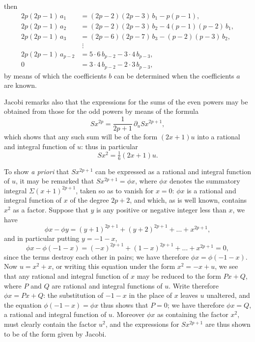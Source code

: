 \documentclass[11pt]{article}
\begin{document}
\noindent then
\[
\begin{aligned}
2p(2p-1)\,a_{1} &= (2p-2)(2p-3)\,b_{1} - p(p-1),\\
2p(2p-1)\,a_{2} &= (2p-2)(2p-3)\,b_{2} - 4(p-1)(p-2)\,b_{1},\\
2p(2p-1)\,a_{3} &= (2p-6)(2p-7)\,b_{3} - (p-2)(p-3)\,b_{2},\\
&\;\vdots\\
2p(2p-1)\,a_{p-2} &= 5\cdot 6\, b_{p-2} - 3\cdot 4\, b_{p-3},\\
0 &= 3\cdot 4\, b_{p-2} - 2\cdot 3\, b_{p-3},
\end{aligned}
\]
by means of which the coefficients $b$ can be determined when the coefficients $a$ are
known.

Jacobi remarks also that the expressions for the sums of the even powers may
be obtained from those for the odd powers by means of the formula
\[
S x^{2p} = \frac{1}{2p+1}\,\partial_{u} S x^{2p+1},
\]
which shows that any such sum will be of the form $(2x+1)u$ into a rational and
integral function of $u$: thus in particular
\[
S x^{2} = \tfrac{1}{6}(2x+1)u.
\]

To show \textit{a priori} that $S x^{2p+1}$ can be expressed as a rational and integral function
of $u$, it may be remarked that $S x^{2p+1} = \phi x$, where $\phi x$ denotes the summatory integral
$\Sigma(x+1)^{2p+1}$, taken so as to vanish for $x=0$: $\phi x$ is a rational and integral function
of $x$ of the degree $2p+2$, and which, as is well known, contains $x^{2}$ as a factor.
Suppose that $y$ is any positive or negative integer less than $x$, we have
\[
\phi x - \phi y = (y+1)^{2p+1} + (y+2)^{2p+1} + \ldots + x^{2p+1},
\]
and in particular putting $y = -1 - x$,
\[
\phi x - \phi(-1-x) = (-x)^{2p+1} + (1-x)^{2p+1} + \ldots + x^{2p+1} = 0,
\]
since the terms destroy each other in pairs; we have therefore $\phi x = \phi(-1-x)$.
Now $u = x^{2} + x$, or writing this equation under the form $x^{2} = -x + u$, we see that any
rational and integral function of $x$ may be reduced to the form $Px + Q$, where
$P$ and $Q$ are rational and integral functions of $u$. Write therefore $\phi x = Px + Q$: the
substitution of $-1-x$ in the place of $x$ leaves $u$ unaltered, and the equation
$\phi(-1-x) = \phi x$ thus shows that $P = 0$; we have therefore $\phi x = Q$, a rational and
integral function of $u$. Moreover $\phi x$ as containing the factor $x^{2}$, must clearly contain
the factor $u^{2}$, and the expressions for $S x^{2p+1}$ are thus shown to be of the form given
by Jacobi.
\end{document}
